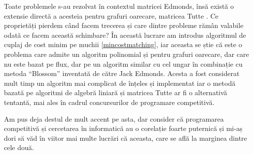 Toate problemele s-au rezolvat în contextul matricei Edmonds, însă există o extensie
directă a acesteia pentru grafuri oarecare, matricea Tutte \cite{tutte}. Ce
proprietăți pierdem când facem trecerea și care dintre probleme rămân valabile
odată ce facem această schimbare? În această lucrare am introdus algoritmul de
cuplaj de cost minim pe muchii \ref{mincostmatching}, iar aceasta se știe că este
o problema care admite un algoritm polinomial și pentru grafuri oarecare, dar care
nu este bazat pe flux, dar pe un algoritm similar cu cel ungar în combinație cu
metoda ``Blossom'' inventată de către Jack Edmonds. Acesta a fost considerat mult
timp un algoritm mai complicat de înțeles și implementat iar o metodă bazată pe
algoritmi de algebră liniară și matricea Tutte ar fi o alternativă tentantă, mai
ales în cadrul concursurilor de programare competitivă.

Am pus deja destul de mult accent pe asta, dar consider că programarea competitivă
și cercetarea în informatică au o corelație foarte puternică și mi-aș dori să văd
în viitor mai multe lucrări că aceasta, care se află la marginea dintre cele două.
